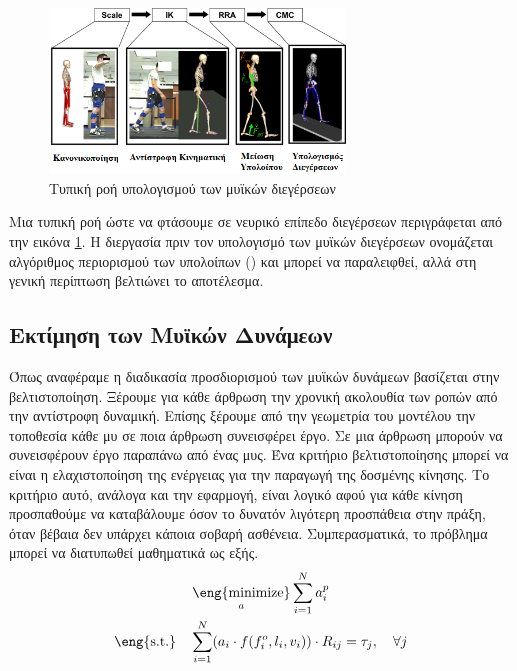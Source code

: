 \begin{figure}[H]
    \centering
    \includegraphics[width=0.7\textwidth, keepaspectratio]{fig/ik-to-excitation.png}
    \caption{Τυπική ροή υπολογισμού των μυϊκών διεγέρσεων\protect\footnotemark}
    \label{fig:ik-to-excitation}
\end{figure}

Μια τυπική ροή ώστε να φτάσουμε σε νευρικό επίπεδο διεγέρσεων περιγράφεται από την εικόνα \ref{fig:ik-to-excitation}. Η διεργασία πριν τον υπολογισμό των μυϊκών διεγέρσεων ονομάζεται αλγόριθμος περιορισμού των υπολοίπων () και μπορεί να παραλειφθεί, αλλά στη γενική περίπτωση βελτιώνει το αποτέλεσμα.

\subsection{Εκτίμηση των Μυϊκών Δυνάμεων}

Όπως αναφέραμε η διαδικασία προσδιορισμού των μυϊκών δυνάμεων βασίζεται στην βελτιστοποίηση. Ξέρουμε για κάθε άρθρωση την χρονική ακολουθία των ροπών από την αντίστροφη δυναμική. Επίσης ξέρουμε από την γεωμετρία του μοντέλου την τοποθεσία κάθε μυ σε ποια άρθρωση συνεισφέρει έργο. Σε μια άρθρωση μπορούν να συνεισφέρουν έργο παραπάνω από ένας μυς. Ένα κριτήριο βελτιστοποίησης μπορεί να είναι η ελαχιστοποίηση της ενέργειας για την παραγωγή της δοσμένης κίνησης. Το κριτήριο αυτό, ανάλογα και την εφαρμογή, είναι λογικό αφού για κάθε κίνηση προσπαθούμε να καταβάλουμε όσον το δυνατόν λιγότερη προσπάθεια στην πράξη, όταν βέβαια δεν υπάρχει κάποια σοβαρή ασθένεια. Συμπερασματικά, το πρόβλημα μπορεί να διατυπωθεί μαθηματικά ως εξής.\\

\begin{equation}
    \begin{gathered}
        \underset{a}{\text{\eng{minimize}}} \sum_{i=1}^{N} a_{i}^{p} \\
        \text{\eng{s.t.}} \quad
        \sum_{i=1}^{N} (a_{i} \cdot f(f^{o}_{i}, l_{i}, v_{i})) \cdot  R_{ij} = \tau_{j}, \quad \forall j
    \end{gathered}
    \label{equ:static-optimization}
\end{equation}

